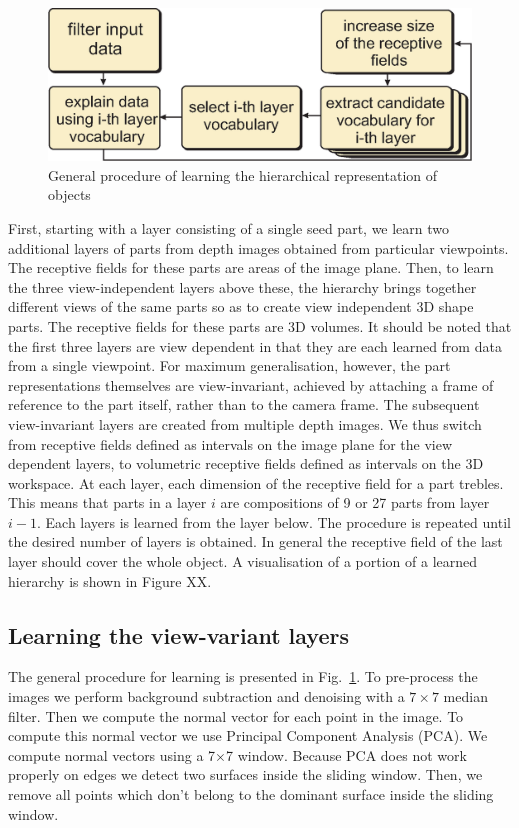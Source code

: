 \documentclass[letterpaper,10pt,conference]{ieeeconf}  %
\begin{document}
\begin{figure}[t]
 \centering
\includegraphics[width=0.9\columnwidth]{../images/learningGeneral.eps}
\caption{General procedure of learning the hierarchical representation of objects}
 \label{hopProc}
\end{figure}

First, starting with a layer consisting of a single seed part, we learn two additional layers of parts from depth images obtained from particular viewpoints. The receptive fields for these parts are areas of the image plane. Then, to learn the three view-independent layers above these, the hierarchy brings together different views of the same parts so as to create view independent 3D shape parts. The receptive fields for these parts are 3D volumes. It should be noted that the first three layers are view dependent in that they are each learned from data from a single viewpoint. For maximum generalisation, however, the part representations themselves are view-invariant, achieved by attaching a frame of reference to the part itself, rather than to the camera frame.  The subsequent view-invariant layers are created from multiple depth images. We thus switch from receptive fields defined as intervals on the image plane for the view dependent layers, to volumetric receptive fields defined as intervals on the 3D workspace. At each layer, each dimension of the receptive field for a part trebles. This means that parts in a layer $i$ are compositions of 9 or 27 parts from layer $i-1$.  Each layers is learned from the layer below. The procedure is repeated until the desired number of layers is obtained. In general the receptive field of the last layer should cover the whole object. A visualisation of a portion of a learned hierarchy is shown in Figure XX.  

\subsection{Learning the view-variant layers}

The general procedure for learning is presented in Fig.~\ref{hopProc}. To pre-process the images we perform background subtraction and denoising with a $7 \times 7$ median filter.  Then we compute the normal vector for each point in the image. To compute this normal vector we use Principal Component Analysis (PCA). We compute normal vectors using a 7$\times$7 window. Because PCA does not work properly on edges we detect two surfaces inside the sliding window. Then, we remove all points which don't belong to the dominant surface inside the sliding window.
\end{document}
